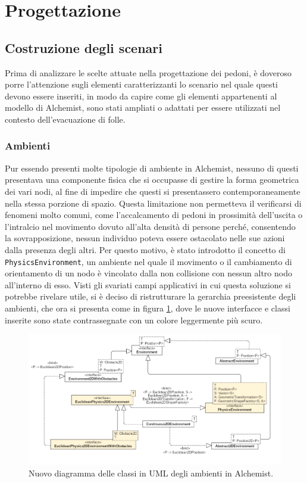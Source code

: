 \section{Progettazione}

\subsection{Costruzione degli scenari}
Prima di analizzare le scelte attuate nella progettazione dei pedoni, è doveroso porre l'attenzione sugli elementi caratterizzanti lo scenario nel quale questi devono essere inseriti, in modo da capire come gli elementi appartenenti al modello di Alchemist, sono stati ampliati o adattati per essere utilizzati nel contesto dell'evacuazione di folle. 

\subsubsection{Ambienti}
Pur essendo presenti molte tipologie di ambiente in Alchemist, nessuno di questi presentava una componente fisica che si occupasse di gestire la forma geometrica dei vari nodi, al fine di impedire che questi si presentassero contemporaneamente nella stessa porzione di spazio. \newline
Questa limitazione non permetteva il verificarsi di fenomeni molto comuni, come l'accalcamento di pedoni in prossimità dell'uscita o l'intralcio nel movimento dovuto all'alta densità di persone perché, consentendo la sovrapposizione, nessun individuo poteva essere ostacolato nelle sue azioni dalla presenza degli altri. \newline
Per questo motivo, è stato introdotto il concetto di \texttt{PhysicsEnvironment}, un ambiente nel quale il movimento o il cambiamento di orientamento di un nodo è vincolato dalla non collisione con nessun altro nodo all'interno di esso. \newline
Visti gli svariati campi applicativi in cui questa soluzione si potrebbe rivelare utile, si è deciso di ristrutturare la gerarchia preesistente degli ambienti, che ora si presenta come in figura \ref{fig:environments-uml}, dove le nuove interfacce e classi inserite sono state contrassegnate con un colore leggermente più scuro.

\begin{figure}[ht]
  \centering
  \includegraphics[width=1.0\linewidth]{immagini/uml/environments.png}
  \caption{Nuovo diagramma delle classi in UML degli ambienti in Alchemist.}
  \label{fig:environments-uml}
\end{figure}

